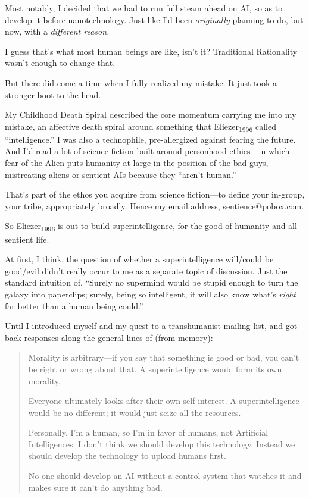 {
 Most notably, I decided that we had to run full steam ahead on AI,
so as to develop it before nanotechnology. Just like
I'd been \textit{originally} planning to do, but now,
with a \textit{different reason.}}

{
 I guess that's what most human beings are like,
isn't it? Traditional Rationality
wasn't enough to change that.}

{
 But there did come a time when I fully realized my mistake. It
just took a stronger boot to the head.}

\myendsectiontext


{
 My Childhood Death Spiral described the core momentum carrying me
into my mistake, an affective death spiral around something that
Eliezer\textsubscript{1996} called
``intelligence.'' I was also a
technophile, pre-allergized against fearing the future. And
I'd read a lot of science fiction built around
personhood ethics---in which fear of the Alien puts humanity-at-large
in the position of the bad guys, mistreating aliens or sentient AIs
because they ``aren't
human.'' }

{
 That's part of the ethos you acquire from science
fiction---to define your in-group, your tribe, appropriately broadly.
Hence my email address, sentience@pobox.com.}

{
 So Eliezer\textsubscript{1996} is out to build superintelligence,
for the good of humanity and all sentient life.}

{
 At first, I think, the question of whether a superintelligence
will/could be good/evil didn't really occur to me as a
separate topic of discussion. Just the standard intuition of,
``Surely no supermind would be stupid enough to turn
the galaxy into paperclips; surely, being so intelligent, it will also
know what's \textit{right} far better than a human
being could.''}

{
 Until I introduced myself and my quest to a transhumanist mailing
list, and got back responses along the general lines of (from memory):}

\begin{quotation}
{
 Morality is arbitrary---if you say that something is good or bad,
you can't be right or wrong about that. A
superintelligence would form its own morality.}

{
 Everyone ultimately looks after their own self-interest. A
superintelligence would be no different; it would just seize all the
resources.}

{
 Personally, I'm a human, so I'm in
favor of humans, not Artificial Intelligences. I don't
think we should develop this technology. Instead we should develop the
technology to upload humans first.}

{
 No one should develop an AI without a control system that watches
 it and makes sure it can't do anything bad.}
\end{quotation}

